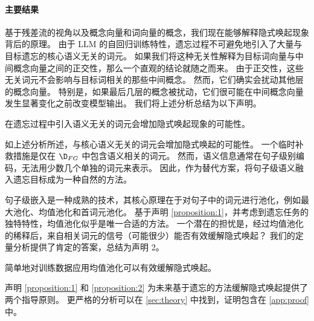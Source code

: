 \paragraph{主要结果}
基于残差流的视角以及概念向量和词向量的概念，我们现在能够解释隐式唤起现象背后的原理。
由于 LLM 的自回归训练特性，遗忘过程不可避免地引入了大量与目标遗忘的核心语义无关的词元。
如果我们将这种无关性解释为目标词向量与中间概念向量之间的正交性，那么一个直观的结论就随之而来。 
由于正交性，这些无关词元不会影响与目标词相关的那些中间概念。 
然而，它们确实会扰动其他层的概念向量。 
特别是，如果最后几层的概念被扰动，它们很可能在中间概念向量发生显著变化之前改变模型输出。
我们将上述分析总结为以下声明。

\begin{proposition}\label{proposition:1}
     在遗忘过程中引入语义无关的词元会增加隐式唤起现象的可能性。
\end{proposition}

如上述分析所述，与核心语义无关的词元会增加隐式唤起的可能性。 
一个临时补救措施是仅在 $\D_{FG}$ 中包含语义相关的词元。
然而，语义信息通常在句子级别编码，无法用少数几个单独的词元来表示。
因此，作为替代方案，将句子级语义融入遗忘目标成为一种自然的方法。

句子级嵌入是一种成熟的技术，其核心原理在于对句子中的词元进行池化，例如最大池化、均值池化和首词元池化。
基于声明 \ref{proposition:1}，并考虑到遗忘任务的独特特性，均值池化似乎是唯一合适的方法。
一个潜在的担忧是，经过均值池化的稀释后，来自相关词元的信号（可能很少）能否有效缓解隐式唤起？
我们的定量分析提供了肯定的答案，总结为声明 2。

\begin{proposition}\label{proposition:2}
    简单地对训练数据应用均值池化可以有效缓解隐式唤起。
\end{proposition}

声明 \ref{proposition:1} 和 \ref{proposition:2} 为未来基于遗忘的方法缓解隐式唤起提供了两个指导原则。
更严格的分析可以在 \cref{sec:theory} 中找到，证明包含在 \cref{app:proof} 中。




